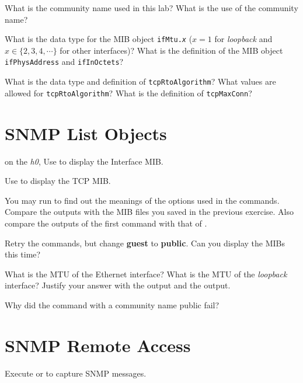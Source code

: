 \documentclass{../UTNetLab}
\begin{document}
\begin{report}
    \item What is the community name used in this lab? What is the use of the
    community name?

    \item What is the data type for the MIB object \texttt{ifMtu.\textit{x}} ($x=1$ for \textit{loopback} and $x \in \{2,3,4,\cdots\}$ for other interfaces)? What is the definition of the MIB object \texttt{ifPhysAddress} and \texttt{ifInOctets}?

    \item What is the data type and definition of \texttt{tcpRtoAlgorithm}? What values are allowed for \texttt{tcpRtoAlgorithm}? What is the definition of \texttt{tcpMaxConn}?
\end{report}

\section{SNMP List Objects}
on the \textit{h0},
Use  to display the Interface MIB.

Use  to display the TCP MIB.

You may run  to find out the meanings of the options used in the commands.
Compare the outputs with the MIB files you saved in the previous exercise.
Also compare the outputs of the first command with that of .

Retry the  commands, but change \textbf{guest} to \textbf{public}.
Can you display the MIBs this time?

\begin{report}
    \item What is the MTU of the Ethernet interface? What is the MTU of the \textit{loopback} interface? Justify your answer with the  output and the  output.

    \item Why did the  command with a community name public fail?
\end{report}

\section{SNMP Remote Access}
Execute  or  to capture SNMP messages.
\end{document}
